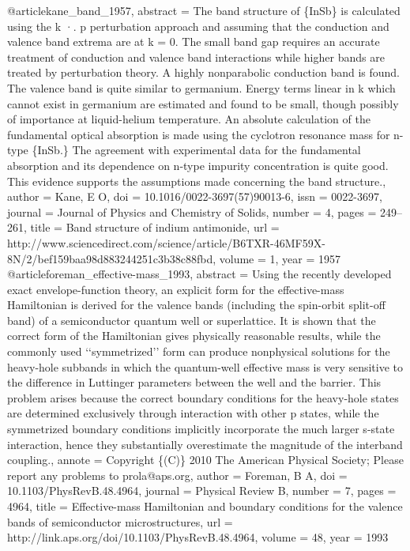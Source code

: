 @article{kane_band_1957,
abstract = {The band structure of \{InSb\} is calculated using the k ·. p perturbation approach and assuming that the conduction and valence band extrema are at k = 0. The small band gap requires an accurate treatment of conduction and valence band interactions while higher bands are treated by perturbation theory. A highly nonparabolic conduction band is found. The valence band is quite similar to germanium. Energy terms linear in k which cannot exist in germanium are estimated and found to be small, though possibly of importance at liquid-helium temperature. An absolute calculation of the fundamental optical absorption is made using the cyclotron resonance mass for n-type \{InSb.\} The agreement with experimental data for the fundamental absorption and its dependence on n-type impurity concentration is quite good. This evidence supports the assumptions made concerning the band structure.},
author = {Kane, E O},
doi = {10.1016/0022-3697(57)90013-6},
issn = {0022-3697},
journal = {Journal of Physics and Chemistry of Solids},
number = {4},
pages = {249--261},
title = {{Band structure of indium antimonide}},
url = {http://www.sciencedirect.com/science/article/B6TXR-46MF59X-8N/2/bef159baa98d883244251c3b38c88fbd},
volume = {1},
year = {1957}
}
@article{foreman_effective-mass_1993,
abstract = {Using the recently developed exact envelope-function theory, an explicit form for the effective-mass Hamiltonian is derived for the valence bands (including the spin-orbit split-off band) of a semiconductor quantum well or superlattice. It is shown that the correct form of the Hamiltonian gives physically reasonable results, while the commonly used ‘‘symmetrized’’ form can produce nonphysical solutions for the heavy-hole subbands in which the quantum-well effective mass is very sensitive to the difference in Luttinger parameters between the well and the barrier. This problem arises because the correct boundary conditions for the heavy-hole states are determined exclusively through interaction with other p states, while the symmetrized boundary conditions implicitly incorporate the much larger s-state interaction, hence they substantially overestimate the magnitude of the interband coupling.},
annote = {Copyright \{(C)\} 2010 The American Physical Society; Please report any problems to prola@aps.org},
author = {Foreman, B A},
doi = {10.1103/PhysRevB.48.4964},
journal = {Physical Review B},
number = {7},
pages = {4964},
title = {{Effective-mass Hamiltonian and boundary conditions for the valence bands of semiconductor microstructures}},
url = {http://link.aps.org/doi/10.1103/PhysRevB.48.4964},
volume = {48},
year = {1993}
}
